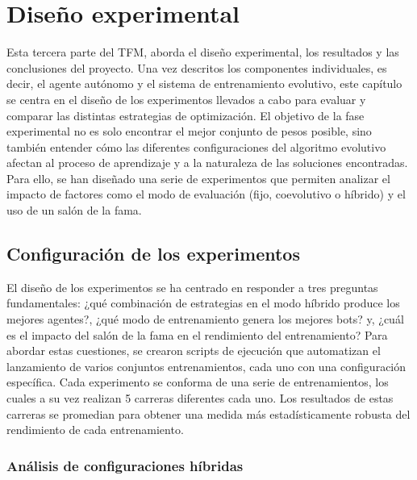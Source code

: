 \chapter{Diseño experimental} \label{chap:experimentacion}

Esta tercera parte del TFM, aborda el diseño experimental, los resultados y las conclusiones del proyecto. Una vez descritos los componentes individuales, es decir, el agente autónomo y el sistema de entrenamiento evolutivo, este capítulo se centra en el diseño de los experimentos llevados a cabo para evaluar y comparar las distintas estrategias de optimización. El objetivo de la fase experimental no es solo encontrar el mejor conjunto de pesos posible, sino también entender cómo las diferentes configuraciones del algoritmo evolutivo afectan al proceso de aprendizaje y a la naturaleza de las soluciones encontradas. Para ello, se han diseñado una serie de experimentos que permiten analizar el impacto de factores como el modo de evaluación (fijo, coevolutivo o híbrido) y el uso de un salón de la fama.

\section{Configuración de los experimentos} \label{sec:configuracion_experimentos}

El diseño de los experimentos se ha centrado en responder a tres preguntas fundamentales: ¿qué combinación de estrategias en el modo híbrido produce los mejores agentes?, ¿qué modo de entrenamiento genera los mejores bots? y, ¿cuál es el impacto del salón de la fama en el rendimiento del entrenamiento? Para abordar estas cuestiones, se crearon scripts de ejecución que automatizan el lanzamiento de varios conjuntos entrenamientos, cada uno con una configuración específica. Cada experimento se conforma de una serie de entrenamientos, los cuales a su vez realizan 5 carreras diferentes cada uno. Los resultados de estas carreras se promedian para obtener una medida más estadísticamente robusta del rendimiento de cada entrenamiento.


\subsection{Análisis de configuraciones híbridas} \label{sec:experimentos_hibridos}


